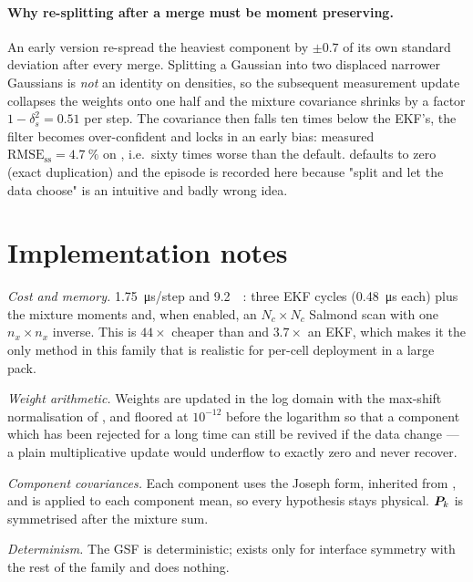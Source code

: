 \paragraph{Why re-splitting after a merge must be moment preserving.}
An early version re-spread the heaviest component by $\pm 0.7$ of its own standard deviation after
every merge.  Splitting a Gaussian into two displaced narrower Gaussians is \emph{not} an identity
on densities, so the subsequent measurement update collapses the weights onto one half and the
mixture covariance shrinks by a factor $1-\delta_s^2 = 0.51$ per step.  The covariance then falls
ten times below the EKF's, the filter becomes over-confident and locks in an early bias: measured
$\mathrm{RMSE}_{\mathrm{ss}} = \SI{4.7}{\percent}$ on , i.e.\ sixty times worse than
the default.
 defaults to zero (exact duplication) and the episode is recorded here because
"split and let the data choose" is an intuitive and badly wrong idea.

\section{Implementation notes}
\emph{Cost and memory.}  \SI{1.75}{\micro\second}/step and \SI{9.2}{\kilo\byte}: three EKF cycles
(\SI{0.48}{\micro\second} each) plus the mixture moments and, when enabled, an $N_c\times N_c$
Salmond scan with one $n_x\times n_x$ inverse.  This is $44\times$ cheaper than 
and $3.7\times$ an EKF, which makes it the only method in this family that is realistic for
per-cell deployment in a large pack.

\emph{Weight arithmetic.}  Weights are updated in the log domain with the max-shift normalisation of
, and floored at $10^{-12}$ before the logarithm so that a
component which has been rejected for a long time can still be revived if the data change --- a
plain multiplicative update would underflow to exactly zero and never recover.

\emph{Component covariances.}  Each component uses the Joseph form, inherited from , and
 is applied to each component mean, so every hypothesis stays physical.  $\bm{P}_k$
is symmetrised after the mixture sum.

\emph{Determinism.}  The GSF is deterministic;  exists only for interface symmetry with
the rest of the family and does nothing.

